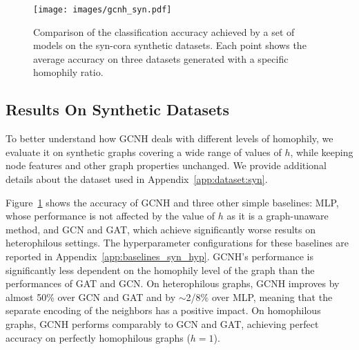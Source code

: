 \documentclass[conference]{IEEEtran}
\begin{document}
\begin{figure}[t]
\centering
\texttt{[image: images/gcnh\_syn.pdf]}
\caption{Comparison of the classification accuracy achieved by a set of models on the syn-cora synthetic datasets. Each point shows the average accuracy on three datasets generated with a specific homophily ratio.}
\label{fig:gcnh_syn}
\end{figure}

\subsection{Results On Synthetic Datasets}

To better understand how GCNH deals with different levels of homophily, we evaluate it on synthetic graphs covering a wide range of values of $h$, while keeping node features and other graph properties unchanged. 
We provide additional details about the dataset used in Appendix~\ref{app:dataset:syn}.

Figure~\ref{fig:gcnh_syn} shows the accuracy of GCNH and three other simple baselines: MLP, whose performance is not affected by the value of $h$ as it is a graph-unaware method, and GCN and GAT, which achieve significantly worse results on heterophilous settings.
The hyperparameter configurations for these baselines are reported in Appendix~\ref{app:baselines_syn_hyp}. 
GCNH's performance is significantly less dependent on the homophily level of the graph than the performances of GAT and GCN. 
On heterophilous graphs, GCNH improves by almost 50\% over GCN and GAT and by $\sim$2/8\% over MLP, meaning that the separate encoding of the neighbors has a positive impact. 
On homophilous graphs, GCNH performs comparably to GCN and GAT, achieving perfect accuracy on perfectly homophilous graphs ($h=1$).
\end{document}
